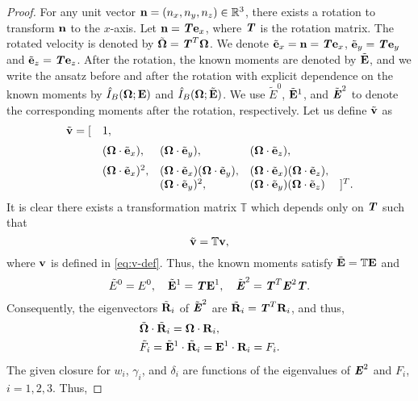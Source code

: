 \begin{proof}
  For any unit vector $\mathbf{n} = (n_x, n_y, n_z) \in \mathbb{R}^3$, there
  exists a rotation to transform $\mathbf{n}$ to the $x$-axis. Let 
  $\mathbf{n} = \boldsymbol{\mathit{T}} \mathbf{e}_x$, where $\boldsymbol{\mathit{T}}$ is the rotation matrix. The
  rotated velocity is denoted by $\tilde{\boldsymbol{\Omega}} = \boldsymbol{\mathit{T}}^T \boldsymbol{\Omega}$.
  We denote $\tilde{\mathbf{e}}_x = \mathbf{n} = \boldsymbol{\mathit{T}} \mathbf{e}_x$,
  $\tilde{\mathbf{e}}_y = \boldsymbol{\mathit{T}} \mathbf{e}_y$ and $\tilde{\mathbf{e}}_z = \boldsymbol{\mathit{T}} \mathbf{e}_z$.
  After the rotation, the known moments are denoted by $\tilde{\mathbf{E}}$,
  and we write the ansatz before and after the rotation with
  explicit dependence on the known moments by
  $\hat I_B(\boldsymbol{\Omega}; \mathbf{E})$ and $\hat I_B(\boldsymbol{\Omega}; \tilde{\mathbf{E}})$. We
  use $\tilde{E}^0$, $\tilde{\mathbf{E}}^1$, and $\tilde{\boldsymbol{\mathit{E}}}^2$ to denote
  the corresponding moments after the rotation, respectively. Let us
  define $\tilde{\mathbf{v}}$ as
  \[
  \begin{array}{rllll}
    \tilde{\mathbf{v}} = [ & 1, &&& \\ [2mm]
                    & (\boldsymbol{\Omega}\cdot\tilde{\mathbf{e}}_x), 
                         & (\boldsymbol{\Omega}\cdot\tilde{\mathbf{e}}_y), 
                           & (\boldsymbol{\Omega}\cdot\tilde{\mathbf{e}}_z), & \\ [2mm]
                    & (\boldsymbol{\Omega}\cdot\tilde{\mathbf{e}}_x)^2, 
                         & (\boldsymbol{\Omega}\cdot\tilde{\mathbf{e}}_x)(\boldsymbol{\Omega}\cdot\tilde{\mathbf{e}}_y), 
                           & (\boldsymbol{\Omega}\cdot\tilde{\mathbf{e}}_x)(\boldsymbol{\Omega}\cdot\tilde{\mathbf{e}}_z), & \\
                    && (\boldsymbol{\Omega}\cdot\tilde{\mathbf{e}}_y)^2, 
                         &(\boldsymbol{\Omega}\cdot\tilde{\mathbf{e}}_y)(\boldsymbol{\Omega}\cdot\tilde{\mathbf{e}}_z) & ]^T.
  \end{array}
  \]
  It is clear there exists a transformation matrix $\mathbb{T}$
  which depends only on $\boldsymbol{\mathit{T}}$ such that
  \[
    \tilde{\mathbf{v}} = \mathbb{T} \mathbf{v},
  \]
  where $\mathbf{v}$ is defined in \eqref{eq:v-def}.
  Thus, the known moments satisfy $\tilde{\mathbf{E}} = \mathbb{T} \mathbf{E}$ and
  \[ 
  \tilde{E}^0 = E^0, \quad \tilde{\mathbf{E}}^1 = \boldsymbol{\mathit{T}} \mathbf{E}^1, \quad
  \tilde{\boldsymbol{\mathit{E}}}^2 = \boldsymbol{\mathit{T}}^T \boldsymbol{\mathit{E}}^2 \boldsymbol{\mathit{T}}.
  \]
  Consequently, the eigenvectors $\tilde{\mathbf{R}}_i$ of $\tilde{\boldsymbol{\mathit{E}}}^2$
  are $\tilde{\mathbf{R}}_i = \boldsymbol{\mathit{T}}^T \mathbf{R}_i$, and thus,
  \[
  \begin{aligned}
    &\tilde{\boldsymbol{\Omega}} \cdot \tilde{\mathbf{R}}_i = \boldsymbol{\Omega} \cdot \mathbf{R}_i, \\
    &\tilde{F}_i = \tilde{\mathbf{E}}^1 \cdot \tilde{\mathbf{R}}_i = \mathbf{E}^1 \cdot
    \mathbf{R}_i = F_i.
  \end{aligned}
  \]
  The given closure for $w_i$, $\gamma_i$, and $\delta_i$
  are functions of the eigenvalues of $\boldsymbol{\mathit{E}}^2$ and $F_i$, $i=1,2,3$. Thus,

\end{proof}
